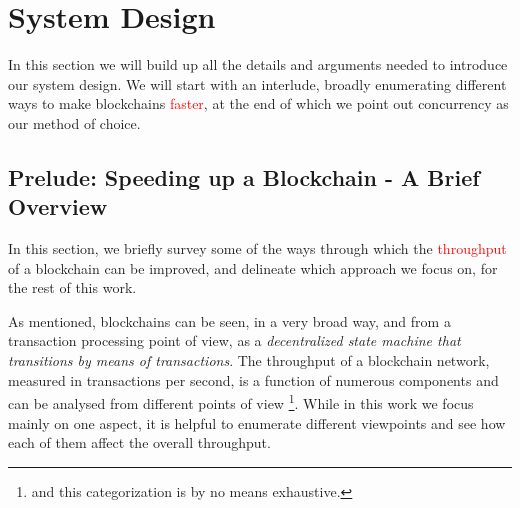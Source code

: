 \chapter{System Design} \label{chap:design}




In this section we will build up all the details and arguments needed to introduce our system design. We will start with an interlude, broadly enumerating different ways to make blockchains \textcolor{red}{faster}, at the end of which we point out concurrency as our method of choice.


\section{Prelude: Speeding up a Blockchain - A Brief Overview}
\label{chap_design:sec:ways_to_speedup}

In this section, we briefly survey some of the ways through which the \textcolor{red}{throughput} of a blockchain can
be improved, and delineate which approach we focus on, for the rest of this work.

As mentioned, blockchains can be seen, in a very broad way, and from a transaction processing point
of view, as a \textit{decentralized state machine that transitions by means of transactions}. The
throughput of a blockchain network, measured in transactions per second, is a function of numerous
components and can be analysed from different points of view \footnote{and this categorization is by
no means exhaustive.}. While in this work we focus mainly on one aspect, it is helpful to enumerate
different viewpoints and see how each of them affect the overall throughput.

